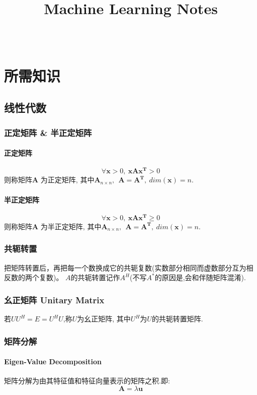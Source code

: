 \documentclass[oneside]{book}
\title{\titlteFont Machine Learning Notes}
\author{\authorFont{Jiang Tao}\\ \NovaMonoFont{vix2018@gmail.com}}
\date{\NovaMonoFont 2019}
\begin{document}
	\begin{titlepage}
		\maketitle
	\end{titlepage}
	\tableofcontents
	\setcounter{chapter}{0}
	\renewcommand{\thechapter}{\Roman{chapter}}
	\chapter{所需知识}
		\section{线性代数}
			\subsection{正定矩阵 \&  半正定矩阵}
				\subsubsection{正定矩阵}
				$$\forall\boldsymbol{x} > 0,~\boldsymbol{xAx^T}>0$$
				则称矩阵$\boldsymbol{A}$ 为正定矩阵, 其中$\boldsymbol{A}_{n\times n},~\boldsymbol{~A = A^T},~dim(\boldsymbol{x})=n$.
				\subsubsection{半正定矩阵}
				$$\forall\boldsymbol{x} > 0,~\boldsymbol{xAx^T}\geq0$$
				则称矩阵$\boldsymbol{A}$ 为半正定矩阵, 其中$\boldsymbol{A}_{n\times n},~\boldsymbol{~A = A^T},~dim(\boldsymbol{x})=n$.
			\subsection{共轭转置}
				把矩阵转置后，再把每一个数换成它的共轭复数(实数部分相同而虚数部分互为相反数的两个复数)。
				$A$的共轭转置记作$A^H$(不写$A^*$的原因是,会和伴随矩阵混淆).
			\subsection{幺正矩阵 Unitary Matrix}
				若$UU^H=E=U^HU$,称$U$为幺正矩阵, 其中$U^H$为$U$的共轭转置矩阵.
			\subsection{矩阵分解}
				\subsubsection{Eigen-Value Decomposition}
					矩阵分解为由其特征值和特征向量表示的矩阵之积.即:
					$$\boldsymbol{A} = \lambda \boldsymbol{u}$$
\end{document}
